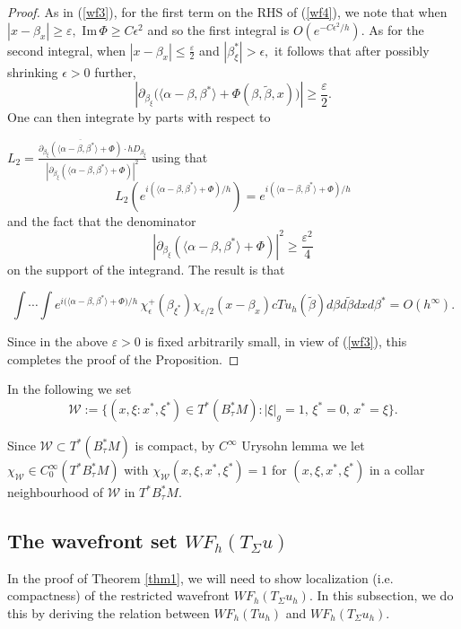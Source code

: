 \documentclass[11pt,reqno]{amsart}
\newcommand{\ep}{\varepsilon}
\renewcommand{\Im} {\mathrm{Im\,}}
\theoremstyle{definition}
\begin{document}
\begin{proof}
As in (\ref{wf3}), for the first term on the RHS of (\ref{wf4}), we note that when $|x-\beta_x | \geq \ep,$
$\Im \Phi \geq C \epsilon^2$ and so the first integral is $O(e^{-C \epsilon^2/h}).$
As for the second integral, when $|x-\beta_x | \leq \frac{\ep}{2}$ and $|\beta_{\xi}^*| >\epsilon,$ it follows that after possibly shrinking $\epsilon>0$ further,
$$ | \partial_{\beta_{\xi}} \big( \langle \alpha - \beta, \beta^* \rangle + \Phi(\beta,\tilde{\beta},x) \big)|  \geq \frac{\ep}{2}.$$
One can then integrate by parts with respect to 

 $ L_2=  \frac{ \overline{\partial_{\beta_{\xi}} ( \langle \alpha - \beta, \beta^* \rangle  + \Phi)} \cdot h D_{\beta_{\xi}}}{  | \partial_{\beta_{\xi}} ( \langle \alpha - \beta, \beta^* \rangle  + \Phi)  |^2}$ using that 
$$ L_2 ( e^{i( \langle \alpha - \beta, \beta^* \rangle  + \Phi)/h} ) = e^{i ( \langle \alpha - \beta, \beta^* \rangle  + \Phi)/h}$$
and the fact that the denominator 
$$ | \partial_{\beta_{\xi}} ( \langle \alpha - \beta, \beta^* \rangle  + \Phi)  |^2 \geq \frac{\ep^2}{4}$$
on the support of the integrand. The result is that

$$ \int \cdots \int e^{i  \big( \langle \alpha - \beta, \beta^* \rangle  + \Phi  \big)/h } \, \chi_{\epsilon}^+ (\beta_{\xi^*})  \chi_{\ep/2}(x-\beta_x) c Tu_h(\tilde{\beta})d\beta d\tilde{\beta} dx d\beta^* = O(h^{\infty}).$$

Since in the above $\ep>0$ is fixed arbitrarily small, in view of (\ref{wf3}), this completes the proof of the Proposition.

\end{proof}




In the following we set
\begin{equation} \label{W}
{\mathcal W}:= \big\{(x,\xi :x^*,\xi^*)\in T^*(B_{\tau}^*M): |\xi|_g=1, \, \xi^* = 0, \, x^* = \xi \big\}.
\end{equation}

Since ${\mathcal W} \subset T^* (B_\tau^*M)$ is compact, by $C^{\infty}$ Urysohn lemma we let $\chi_{{\mathcal W}}\in C^{\infty}_0(T^*B^*_{\tau}M)$ with $\chi_{{\mathcal W}} (x,\xi,x^*,\xi^*) = 1 $ for $(x,\xi,x^*,\xi^*)$ in a  collar neighbourhood of ${\mathcal W}$ in $T^*B^*_{\tau}M.$

\subsection{The wavefront set $WF_h(T_{\Sigma} u)$}\label{secfinal}
In the proof of Theorem \ref{thm1}, we will need to show localization (i.e. compactness) of the restricted wavefront $WF_h (T_{\Sigma} u_h).$ In this subsection, we do this by deriving the relation between $WF_h(Tu_h)$ and $WF_h(T_{\Sigma}u_h).$ 
\end{document}
